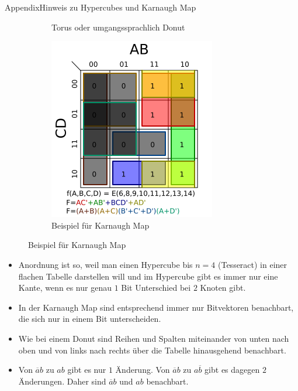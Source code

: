 \begin{frame}[allowframebreaks]{Appendix}{Hinweis zu Hypercubes und Karnaugh Map}
\begin{figure}
\begin{subfigure}{0.4\textwidth}
       \caption{Torus oder umgangssprachlich Donut}
    \end{subfigure}
    \begin{subfigure}{0.4\textwidth}
       \includegraphics[height=0.4\textheight, center]{./figures/K_map.png}
       \caption{Beispiel für Karnaugh Map}
    \end{subfigure}
  \end{figure}
  \begin{itemize}
      \item Anordnung ist so, weil man einen Hypercube bis $n=4$ (Tesseract) in einer flachen Tabelle darstellen will und im Hypercube gibt es immer nur eine Kante, wenn es nur genau $1$ Bit Unterschied bei $2$ Knoten gibt.
      \item In der Karnaugh Map sind entsprechend immer nur Bitvektoren benachbart, die sich nur in einem Bit unterscheiden. 
      \item Wie bei einem Donut sind Reihen und Spalten miteinander von unten nach oben und von links nach rechts über die Tabelle hinausgehend benachbart.
      \item Von $\overline{a}b$ zu $ab$ gibt es nur $1$ Änderung. Von $\overline{a}b$ zu $a\overline{b}$ gibt es dagegen $2$ Änderungen. Daher sind $\overline{a}b$ und $ab$ benachbart.
  \end{itemize} 
\end{frame}
 

